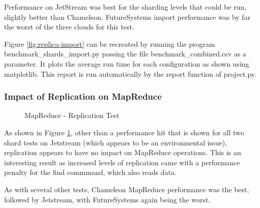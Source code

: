 \documentclass[9pt,twocolumn,twoside]{../../styles/osajnl}
\begin{document}
Performance on JetStream was best for the sharding levels that could be run, slightly better than Chameleon.  FutureSystems import performance was by far the worst of the three clouds for this test.

Figure \ref{fig:replica-import} can be recreated by running the program benchmark\_shards\_import.py passing the file benchmark\_combined.csv as a parameter.  It plots the average run time for each configuration as shown using matplotlib.  This report is run automatically by the report function of project.py.

\subsubsection{Impact of Replication on MapReduce}

\begin{figure}[htbp]
\centering
{}
\caption{MapReduce - Replication Test}
\label{fig:replica-mapreduce}
\end{figure}

As shown in Figure \ref{fig:replica-mapreduce}, other than a performance hit that is shown for all two shard tests on Jetstream (which appears to be an environmental issue), replication appears to have no impact on MapReduce operations.  This is an interesting result as increased levels of replication came with a performance penalty for the find commmand, which also reads data.

As with several other tests, Chameleon MapReduce performance was the best, followed by Jetstream, with FutureSystems again being the worst.
\end{document}
